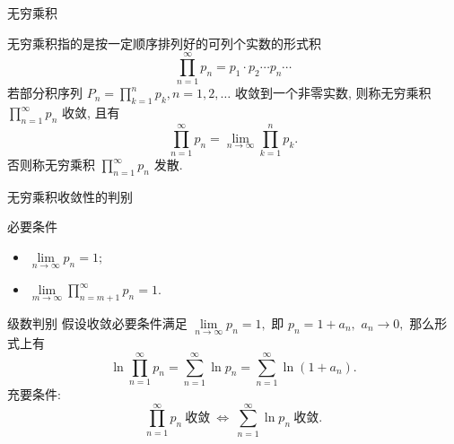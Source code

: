 
\begin{frame}{无穷乘积}

\begin{Def}
无穷乘积指的是{\color{red}按一定顺序排列好}的可列个实数的形式积
\[\prod\limits_{n=1}^\infty p_n = p_1 \cdot p_2 \cdots p_n \cdots\]
\pause
若部分积序列 $P_n = \prod\limits_{k=1}^n p_k, n = 1, 2, \dots$ 收敛到一个{\color{red}非零实数}, 则称无穷乘积 $\prod\limits_{n=1}^\infty p_n$ 收敛, 且有
\[\prod\limits_{n=1}^\infty p_n = \lim\limits_{n\to\infty} \prod\limits_{k=1}^n p_k.\]
否则称无穷乘积 $\prod\limits_{n=1}^\infty p_n$ 发散.
\end{Def}

\end{frame}


\begin{frame}{无穷乘积收敛性的判别}

\begin{block}{必要条件}
\begin{itemize}
\item $\lim\limits_{n\to\infty} p_n = 1;$
\pause
\item $\lim\limits_{m\to\infty} \prod\limits_{n=m+1}^\infty p_n = 1.$
\end{itemize}
\end{block}

\pause

\begin{block}{级数判别}
假设收敛必要条件满足 $\lim\limits_{n\to\infty} p_n = 1,$ 即 $p_n = 1 + a_n,$ $a_n \to 0,$ 那么形式上有
\[\ln \prod\limits_{n=1}^\infty p_n = \sum\limits_{n=1}^\infty \ln p_n = \sum\limits_{n=1}^\infty \ln (1 + a_n).\]
\pause
充要条件:
\[\prod\limits_{n=1}^\infty p_n ~ \text{收敛} ~ \Longleftrightarrow ~ \sum\limits_{n=1}^\infty \ln p_n ~ \text{收敛}.\]
\end{block}

\end{frame}


